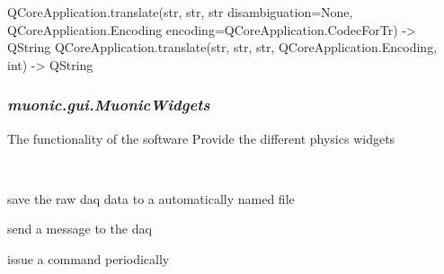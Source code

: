 \documentclass[letterpaper,10pt,english]{sphinxmanual}
\begin{document}

\begin{fulllineitems}
\label{muonic:muonic.gui.MainWindow.tr}
QCoreApplication.translate(str, str, str disambiguation=None, QCoreApplication.Encoding encoding=QCoreApplication.CodecForTr) -\textgreater{} QString
QCoreApplication.translate(str, str, str, QCoreApplication.Encoding, int) -\textgreater{} QString

\end{fulllineitems}



\subsubsection{\emph{muonic.gui.MuonicWidgets}}
\label{muonic:muonic-gui-muonicwidgets}
The functionality of the software
\label{muonic:module-muonic.gui.MuonicWidgets}
Provide the different physics widgets

\begin{fulllineitems}
\label{muonic:muonic.gui.MuonicWidgets.DAQWidget}~

\begin{fulllineitems}
\label{muonic:muonic.gui.MuonicWidgets.DAQWidget.on_file_clicked}
save the raw daq data to a automatically named file

\end{fulllineitems}


\begin{fulllineitems}
\label{muonic:muonic.gui.MuonicWidgets.DAQWidget.on_hello_clicked}
send a message to the daq

\end{fulllineitems}


\begin{fulllineitems}
\label{muonic:muonic.gui.MuonicWidgets.DAQWidget.on_periodic_clicked}
issue a command periodically

\end{fulllineitems}


\end{fulllineitems}
\end{document}

